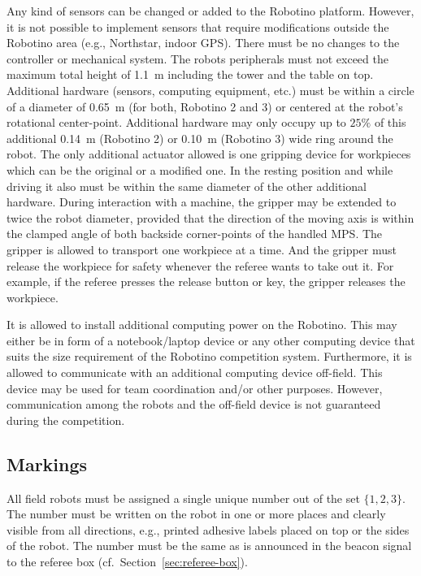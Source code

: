 \documentclass[12pt,twoside]{article}
\newcommand{\Robotino}{Robotino}
\newcommand{\refsec}[1]{Section~\ref{#1}}
\begin{document}
Any kind of sensors can be changed or added to	 the Robotino platform.
However, it is not possible to implement sensors that require
modifications outside the Robotino area (e.g., Northstar, indoor GPS).
There must be no changes to the controller or mechanical system.
The robots peripherals must not exceed the maximum total height of
\SI{1.1}{\metre} including the tower and the table on top. Additional
hardware (sensors, computing equipment, etc.)  must be within a circle
of a diameter of \SI{0.65}{\metre}  (for both, Robotino 2 and 3) or
centered at the robot's rotational center-point. Additional hardware
may only occupy up to $25\%$ of this additional \SI{0.14}{\metre}
(Robotino 2) or \SI{0.10}{\metre} (Robotino 3) wide ring around the
robot. The only additional actuator allowed is one gripping device for
workpieces which can be the original or a modified one. In the resting
position and while driving it also must be within the same diameter of
the other additional hardware.
During interaction with a machine, the gripper may be extended to
twice the robot diameter, provided that the direction of the moving
axis is within the clamped angle of both backside corner-points of the
handled MPS\@.
The gripper is allowed to transport one workpiece at a time. And the
gripper must release the workpiece for safety whenever the referee
wants to take out it. For example, if the referee presses the release
button or key, the gripper releases the workpiece.

It is allowed to install additional computing power on the
\Robotino. This may either be in form of a notebook/laptop device or
any other computing device that suits the size requirement of the
\Robotino{} competition system. Furthermore, it is allowed to
communicate with an additional computing device off-field. This device
may be used for team coordination and/or other purposes. However,
communication among the robots and the off-field device is not
guaranteed during the competition.

\subsection{Markings}
\label{sec:robot-markings}
All field robots must be assigned a single unique number out of the
set $\{1, 2, 3\}$. The number must be written on the robot in one or
more places and clearly visible from all directions, e.g., printed
adhesive labels placed on top or the sides of the robot. The number
must be the same as is announced in the beacon signal to the referee
box (cf.~\refsec{sec:referee-box}).
\end{document}

